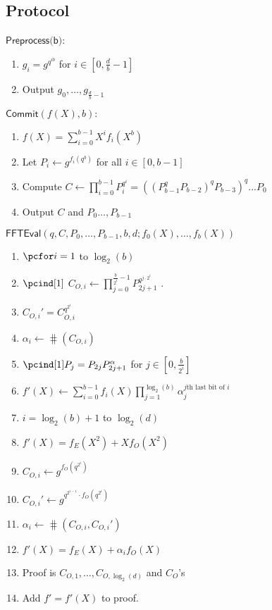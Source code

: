 \documentclass[12pt]{article}
\begin{document}
\subsection{Protocol}
\begin{mdframed}
$\textsf{Preprocess(b)}$:
\begin{enumerate}[nolistsep]
	\item $g_i=g^{q^{ib}}$ for $i \in [0,\frac{d}{b}-1]$
	\item Output $g_0,\dots,g_{\frac{d}{b}-1}$
\end{enumerate}
$\textsf{Commit}(f(X),b):$
\begin{enumerate}[nolistsep]
	\item $f(X)=\sum_{i=0}^{b-1} X^{i} f_i(X^{b})$ 
	\item Let $P_i\gets g^{f_i(q^b)}$ for all $i \in [0,b-1]$
	\item Compute $C\gets \prod_{i=0}^{b-1} P_i^{q^i}=((P_{b-1}^q P_{b-2})^q P_{b-3})^q...P_0$ 
	\item Output $C$ and $P_{0}\dots,P_{b-1}$
\end{enumerate}
$\textsf{FFTEval}(q,C,P_0,\dots,P_{b-1},b,d;f_0(X),\dots,f_{b}(X))$
\begin{enumerate}[nolistsep]
		\item $\pcfor i=1$ to $\log_2(b)$
		\item $\pcind[1]$ $C_{O,i}\gets\prod_{j=0}^{\frac{b}{2^i}-1} P_{2j+1}^{q^{j\cdot 2^i}}$ .
		\item \pcind[1] $C_{O,i}'=C_{O,i}^{q^{2^i}}$ 
		\item \pcind[1] $\alpha_i\gets \hash(C_{O,i})$ 
		\item $\pcind[1] P_{j}=P_{2j}P_{2j+1}^{\alpha}$ for $j \in [0,\frac{b}{2^i}]$
		\item $f'(X)\gets \sum_{i=0}^{b-1} f_i(X) \prod_{j=1}^{\log_2(b)} \alpha_j^{j\text{th last bit of }i}$ 
		\item \pcfor $i=\log_2(b)+1$ to $\log_2(d)$
		\item \pcind[1] $f'(X)=f_E(X^2)+Xf_O(X^2)$
		\item \pcind[1] $C_{O,i}\gets g^{f_O(q^{2^i})}$ 
		\item  \pcind[1] $C_{O,i}'\gets g^{q^{2^{i-1}} \cdot f_O(q^{2^i})}$ 
		\item \pcind[1] $\alpha_i\gets\hash(C_{O,i},C_{O,i}')$
		\item \pcind[1] $f'(X)=f_E(X)+\alpha_i f_O(X)$
		\item Proof is $C_{O,1},\dots,C_{O,\log_2(d)}$ and $C_O$'s
		\item Add $f'=f'(X)$ to proof.
	\end{enumerate}
	\end{mdframed}
\end{document}

